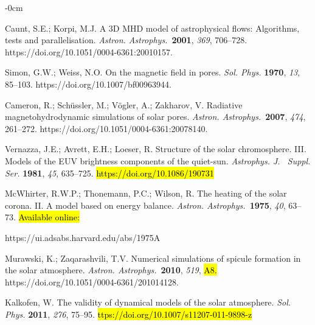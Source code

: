 \documentclass[physics,article,accept,pdftex,moreauthors]{Definitions/mdpi}
\newcommand{\aap}{{\it Astron. Astrophys.}}
\begin{document}
\begin{adjustwidth}{-\extralength}{0cm}
\begin{thebibliography}{999}
		Caunt, S.E.; Korpi, M.J. A 3D MHD model of astrophysical flows: Algorithms, tests and parallelisation. \aap~\textbf{2001}, \emph{369}, 706--728. https://doi.org/10.1051/0004-6361:20010157.
		
		Simon, G.W.; Weiss, N.O. On the magnetic field in pores. \emph{Sol. Phys.} \textbf{1970}, \emph{13}, 85--103. https://doi.org/10.1007/bf00963944.
		
		Cameron, R.; Schüssler, M.; Vögler, A.; Zakharov, V. Radiative magnetohydrodynamic simulations of solar pores. \aap~\textbf{2007}, \emph{474}, 261--272. https://doi.org/10.1051/0004-6361:20078140.
		
		Vernazza, J.E.; Avrett, E.H.; Loeser, R. Structure of the solar chromosphere. III. Models of the EUV brightness components of the 
quiet-sun. \emph{Astrophys. J.~ Suppl. Ser.} \textbf{1981}, \emph{45}, 635--725. \hl{https://doi.org/10.1086/190731}

		{McWhirter}, R.W.P.; {Thonemann}, P.C.; {Wilson}, R. {The heating of
			the solar corona. II. A model based on energy balance}. \aap~\textbf{1975}, \emph{40}, 63--73.
		\hl{Available online:} {https://ui.adsabs.harvard.edu/abs/1975A%
		
		
		
		
		Murawski, K.; Zaqarashvili, T.V. Numerical simulations of spicule formation in the solar atmosphere. \aap~\textbf{2010}, \emph{519}, 
\hl{A8.} %
https://doi.org/10.1051/0004-6361/201014128.
		
		
		Kalkofen, W. The validity of dynamical models of the solar atmosphere. \emph{Sol. Phys.} \textbf{2011}, \emph{276}, 75--95.
\hl{ttps://doi.org/10.1007/s11207-011-9898-z} 		

}
\end{thebibliography}
\end{adjustwidth}
\end{document}
